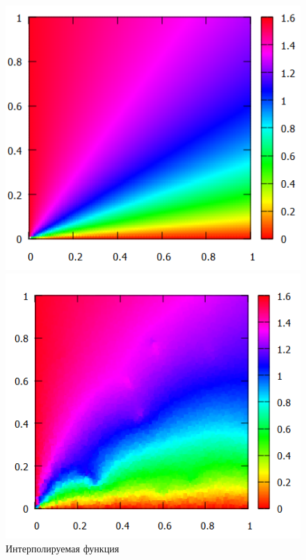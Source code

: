 \documentclass[14pt, a4paper]{extarticle}
\begin{document}
\begin{enumerate}
			\begin{figure}[H]
				\begin{minipage}{0.5\textwidth}
					\centering
					\includegraphics[width = \linewidth]{../3func/orig.png}
					\caption[.] {Интерполируемая функция}
				\end{minipage}\hfill
				\begin{minipage}{0.5\textwidth}
					\centering
					\includegraphics[width = \linewidth]{../3func/M=10T=5774Err=0.0901691.png}

\end{minipage}
\end{figure}
\end{enumerate}
\end{document}
